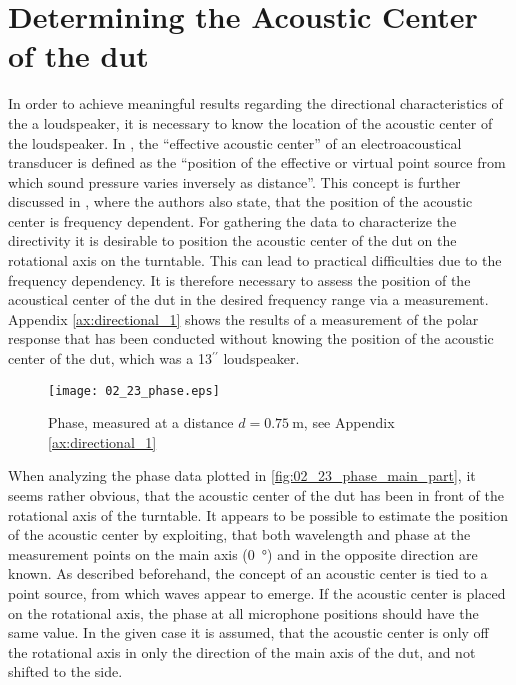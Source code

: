 \section{Determining the Acoustic Center of the \gls{dut}}\label{sec:ac_center}
In order to achieve meaningful results regarding the directional characteristics of the a loudspeaker, it is necessary to know the location of the  acoustic center of the loudspeaker.
In \citep{ansis1.1}, the ``effective acoustic center'' of an electroacoustical transducer is defined as the ``position of the effective or virtual point source from which sound pressure varies inversely as distance''. This concept is further discussed in \citep{jacobsenetal}, where the authors also state, that the position of the acoustic center is frequency dependent. For gathering the data to characterize the directivity it is desirable to position the acoustic center of the \gls{dut} on the rotational axis on the turntable. This can lead to practical difficulties due to the frequency dependency. It is therefore necessary to assess the position of the acoustical center of the \gls{dut} in the desired frequency range via a measurement.\\
Appendix \ref{ax:directional_1} shows the results of a measurement of the polar response that has been conducted without knowing the position of the acoustic center of the \gls{dut}, which was a \citep{seas33} 13$^{\prime \prime}$ loudspeaker. 
\begin{figure}[htbp]
	\centering
	\texttt{[image: 02\_23\_phase.eps]}
	\caption{Phase, measured at a distance $d = \SI{0.75}{\meter}$, see Appendix \ref{ax:directional_1}}
		\label{fig:02_23_phase_main_part}
\end{figure}
When analyzing the phase data plotted in \autoref{fig:02_23_phase_main_part}, it seems rather obvious, that the acoustic center of the \gls{dut} has been in front of the rotational axis of the turntable. 
It appears to be possible to estimate the position of the acoustic center by exploiting, that both wavelength and phase at the measurement points on the main axis (\SI{0}{\degree}) and in the opposite direction are known. As described beforehand, the concept of an acoustic center is tied to a  point source, from which waves appear to emerge. If the acoustic center is placed  on the rotational axis, the phase at all microphone positions should have the same value. In the given case it is assumed, that the acoustic center is only off the rotational axis in only the direction of the main axis of the \gls{dut}, and not shifted to the side.
